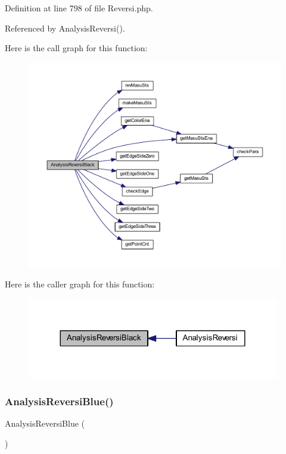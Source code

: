 Definition at line 798 of file Reversi.\+php.



Referenced by Analysis\+Reversi().

Here is the call graph for this function\+:
\nopagebreak
\begin{figure}[H]
\begin{center}
\leavevmode
\includegraphics[width=350pt]{class_reversi_a471972ec549188f7eb701d57e14ae7a1_cgraph}
\end{center}
\end{figure}
Here is the caller graph for this function\+:
\nopagebreak
\begin{figure}[H]
\begin{center}
\leavevmode
\includegraphics[width=312pt]{class_reversi_a471972ec549188f7eb701d57e14ae7a1_icgraph}
\end{center}
\end{figure}
\mbox{\label{class_reversi_a3b581c4861bda72706a1d7146c910ad2}} 
\subsubsection{\texorpdfstring{Analysis\+Reversi\+Blue()}{AnalysisReversiBlue()}}
{\footnotesize\ttfamily Analysis\+Reversi\+Blue (\begin{DoxyParamCaption}{ }\end{DoxyParamCaption})\hspace{0.3cm}{\ttfamily [private]}}



